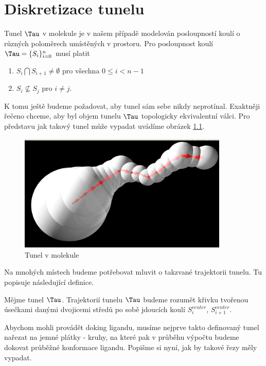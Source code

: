 \chapter{Diskretizace tunelu}
\setcounter{page}{1}

Tunel $ \Tau $ v molekule je v našem případě modelován posloupností koulí o různých
poloměrech umístěných v prostoru. Pro posloupnost koulí $ \Tau = \{S_i\}_{i=0}^{n} $
musí platit

    \begin{enumerate}[label={(\arabic*)}]
        \item $ S_i \bigcap S_{i+1} \neq \emptyset $ pro všechna $ 0 \leq i < n - 1$
        \item $ S_i \nsubseteq S_j$  pro $ i \neq j $.
    \end{enumerate}

K tomu ještě budeme požadovat, aby tunel sám sebe nikdy neprotínal. Exaktněji řečeno
chceme, aby byl objem tunelu $ \Tau $ topologicky ekvivalentní válci.
Pro představu jak takový tunel může vypadat uvádíme obrázek \ref{fig:basic_tunnel}.
\begin{figure}[ht]
  	\centering
	\includegraphics[width=100mm]{img/basic_tunnel.jpg}
	\caption{Tunel v molekule}
  \centering
  \label{fig:basic_tunnel}
\end{figure}

Na mnohých místech budeme potřebovat mluvit o takzvané trajektorii tunelu. Tu popisuje
následující definice.

\begin{defi}
Mějme tunel $ \Tau $. Trajektorií tunelu $ \Tau $ budeme rozumět křivku tvořenou
úsečkami danými dvojicemi středů po sobě jdoucích koulí $ S_i^{center} $,
$ S_{i+1}^{center} $.
\end{defi}

Abychom mohli provádět doking ligandu, musíme nejprve takto definovaný tunel nařezat na
jemné plátky - kruhy, na které pak v průběhu výpočtu budeme dokovat průběžné konformace ligandu.
Popišme si nyní, jak by takové řezy měly vypadat.

